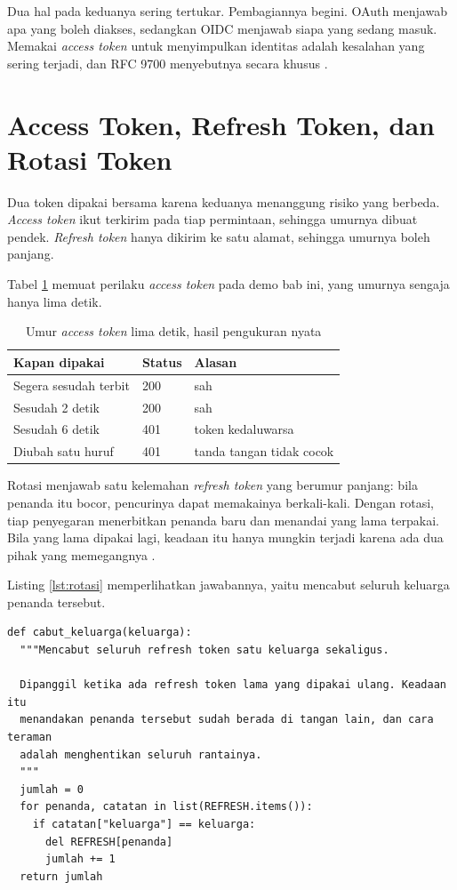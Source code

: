 Dua hal pada keduanya sering tertukar. Pembagiannya begini. OAuth menjawab
apa yang boleh diakses, sedangkan OIDC menjawab siapa yang sedang masuk.
Memakai \textit{access token} untuk menyimpulkan identitas adalah kesalahan
yang sering terjadi, dan RFC 9700 menyebutnya secara khusus
\cite{rfc9700}.

\section{Access Token, Refresh Token, dan Rotasi Token}

Dua token dipakai bersama karena keduanya menanggung risiko yang berbeda.
\textit{Access token} ikut terkirim pada tiap permintaan, sehingga umurnya
dibuat pendek. \textit{Refresh token} hanya dikirim ke satu alamat, sehingga
umurnya boleh panjang.

Tabel \ref{tab:umur-token} memuat perilaku \textit{access token} pada demo
bab ini, yang umurnya sengaja hanya lima detik.

\begin{table}[!htb]
  \centering
  \caption{Umur \textit{access token} lima detik, hasil pengukuran nyata}
  \label{tab:umur-token}
  \begin{tabularx}{\textwidth}{Xll}
    \hline
    \textbf{Kapan dipakai} & \textbf{Status} & \textbf{Alasan} \\
    \hline
    Segera sesudah terbit & 200 & sah \\
    \hline
    Sesudah 2 detik & 200 & sah \\
    \hline
    Sesudah 6 detik & 401 & token kedaluwarsa \\
    \hline
    Diubah satu huruf & 401 & tanda tangan tidak cocok \\
    \hline
  \end{tabularx}
\end{table}

Rotasi menjawab satu kelemahan \textit{refresh token} yang berumur panjang:
bila penanda itu bocor, pencurinya dapat memakainya berkali-kali. Dengan
rotasi, tiap penyegaran menerbitkan penanda baru dan menandai yang lama
terpakai. Bila yang lama dipakai lagi, keadaan itu hanya mungkin terjadi
karena ada dua pihak yang memegangnya \cite{rfc9700}.

Listing \ref{lst:rotasi} memperlihatkan jawabannya, yaitu mencabut seluruh
keluarga penanda tersebut.

\begin{lstlisting}[style=PythonStyle, caption={Pemakaian ulang menandakan penanda sudah di tangan lain, tersedia di \berkas{sources/chapter10/aplikasi.py}}, label={lst:rotasi}]
def cabut_keluarga(keluarga):
  """Mencabut seluruh refresh token satu keluarga sekaligus.

  Dipanggil ketika ada refresh token lama yang dipakai ulang. Keadaan itu
  menandakan penanda tersebut sudah berada di tangan lain, dan cara teraman
  adalah menghentikan seluruh rantainya.
  """
  jumlah = 0
  for penanda, catatan in list(REFRESH.items()):
    if catatan["keluarga"] == keluarga:
      del REFRESH[penanda]
      jumlah += 1
  return jumlah
\end{lstlisting}

